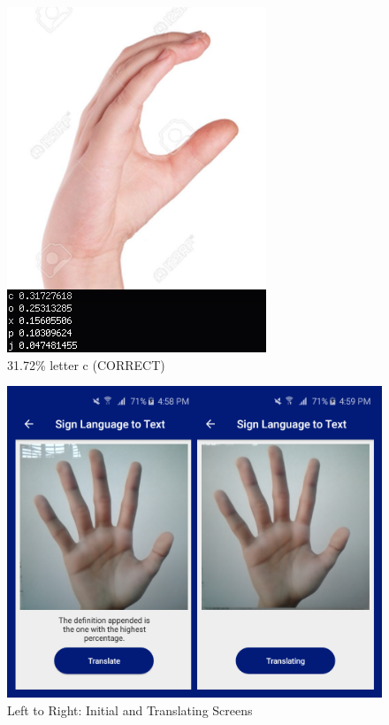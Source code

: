 \documentclass[journal]{./IEEE/IEEEtran}
\begin{document}
\begin{figure}[ht!]
    \centering
    \includegraphics[width=1\linewidth]{./images/c_sample.png}
    \caption{31.72\% letter c (CORRECT)}
    \label{fig:c_sample}
\end{figure}

\begin{figure}[ht!]
    \centering
    \includegraphics[width=1\linewidth]{./images/screen_stt_initial.png}
    \caption{Left to Right: Initial and Translating Screens}
    \label{fig:stt_initial}
\end{figure}
\end{document}
